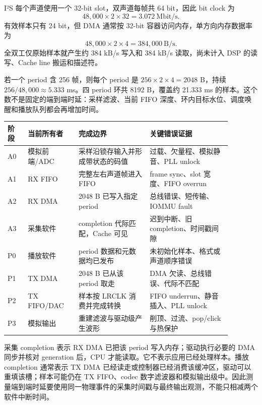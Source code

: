 
I²S 每个声道使用一个 32-bit slot，双声道每帧共 64 bit，因此 bit clock 为
\[
48{,}000\times 2\times 32=3.072\ \mathrm{Mbit/s}.
\]
有效样本只有 24 bit，但 DMA 通常按 32-bit 容器访问内存，单方向内存数据率为
\[
48{,}000\times 2\times 4=384{,}000\ \mathrm{B/s}.
\]
全双工仅原始样本就产生约 384 kB/s 写入和 384 kB/s 读取，尚未计入 DSP 的读写、Cache line 搬运和描述符。

若一个 period 含 256 帧，则每个 period 是 $256\times2\times4=2048$ B，持续 $256/48{,}000\approx5.333$ ms。四 period 环共 8192 B，覆盖约 21.333 ms 的样本。这个数不是固定的端到端时延：采样滤波、当前 FIFO 深度、环内目标水位、调度唤醒和播放队列都会再增加时间。

\begin{longtable}{L{0.08\linewidth}L{0.2\linewidth}L{0.28\linewidth}L{0.32\linewidth}}
\toprule
阶段 & 当前所有者 & 完成边界 & 关键错误证据 \\
\midrule
A0 & 模拟前端/ADC & 采样沿锁存输入并形成带状态的码值 & 过载、欠量程、模拟静音、PLL unlock \\\tablerowrule
A1 & RX FIFO & 完整左右声道帧进入 FIFO & frame sync、slot 宽度、FIFO overrun \\\tablerowrule
A2 & RX DMA & 2048 B 已写入指定 period & 总线错误、短传输、IOMMU fault \\\tablerowrule
A3 & 采集软件 & completion 代际匹配，Cache 可见 & 迟到中断、旧 completion、时间戳间隙 \\\tablerowrule
P0 & 播放软件 & period 数据和元数据均已发布 & 未初始化样本、格式或声道顺序错误 \\\tablerowrule
P1 & TX DMA & 2048 B 已从该 period 取走 & DMA 欠读、总线错误、代际不匹配 \\\tablerowrule
P2 & TX FIFO/DAC & 样本按 LRCLK 消费并完成转换 & FIFO underrun、静音插入、PLL unlock \\\tablerowrule
P3 & 模拟输出 & 重建滤波与驱动级产生波形 & 削顶、过流、pop/click 与热保护 \\
\bottomrule
\end{longtable}


采集 completion 表示 RX DMA 已把该 period 写入内存；驱动执行必要的 DMA 同步并核对 generation 后，CPU 才能读取。它不表示应用已经处理样本。播放 completion 通常表示 TX DMA 已经读走或控制器已经消费该缓冲区，驱动可以重填该槽；样本可能仍在 TX FIFO、codec 数字滤波器和模拟输出级中。因此测量端到端时延要使用同一物理事件的采集时间戳与最终输出观测，不能只相减两个软件中断时间。

